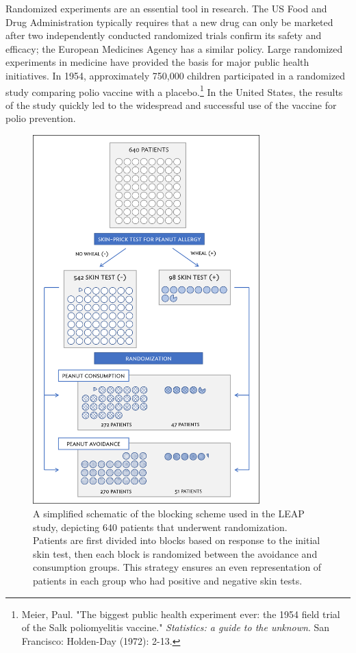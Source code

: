 Randomized experiments are an essential tool in research. The US Food and Drug Administration typically requires that a new drug can only be marketed after two independently conducted randomized trials confirm its safety and efficacy; the European Medicines Agency has a similar policy. Large randomized experiments in medicine have provided the basis for major public health initiatives. In 1954, approximately 750,000 children participated in a randomized study comparing polio vaccine with a placebo.\footnote{Meier, Paul. "The biggest public health experiment ever: the 1954 field trial of the Salk poliomyelitis vaccine." \textit{Statistics: a guide to the unknown}. San Francisco: Holden-Day (1972): 2-13.}  In the United States, the results of the study quickly led to the widespread and successful use of the vaccine for polio prevention.

	\begin{figure}
		\centering
		\includegraphics[width=0.78\textwidth]{ch_01a_intro_to_data_oi_biostat/figures/leapBlocking/leapBlocking.png}
		\caption{A simplified schematic of the blocking scheme used in the LEAP study, depicting 640 patients that underwent randomization. Patients are first divided into blocks based on response to the initial skin test, then each block is randomized between the avoidance and consumption groups. This strategy ensures an even representation of patients in each group who had positive and negative skin tests.}
		\label{leapBlocking}
	\end{figure}

